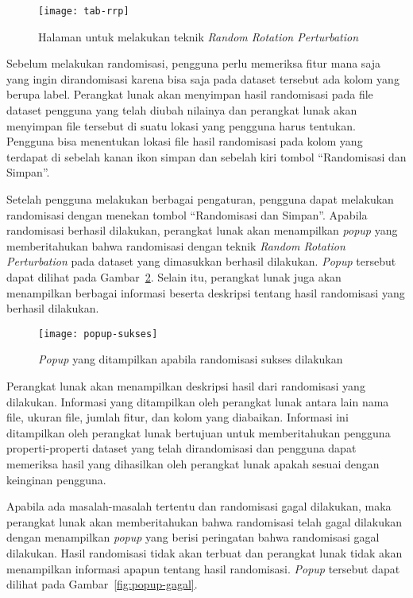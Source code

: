 \begin{figure}
	\centering
	\texttt{[image: tab-rrp]}
	\caption{Halaman untuk melakukan teknik \textit{Random Rotation Perturbation}}
	\label{fig:tab-rrp}
\end{figure}

Sebelum melakukan randomisasi, pengguna perlu memeriksa fitur mana saja yang ingin dirandomisasi karena bisa saja pada dataset tersebut ada kolom yang berupa label. Perangkat lunak akan menyimpan hasil randomisasi pada file dataset pengguna yang telah diubah nilainya dan perangkat lunak akan menyimpan file tersebut di suatu lokasi yang pengguna harus tentukan. Pengguna bisa menentukan lokasi file hasil randomisasi pada kolom yang terdapat di sebelah kanan ikon simpan dan sebelah kiri tombol \textquotedblleft Randomisasi dan Simpan\textquotedblright.

Setelah pengguna melakukan berbagai pengaturan, pengguna dapat melakukan randomisasi dengan menekan tombol \textquotedblleft Randomisasi dan Simpan\textquotedblright. Apabila randomisasi berhasil dilakukan, perangkat lunak akan menampilkan \textit{popup} yang memberitahukan bahwa randomisasi dengan teknik \textit{Random Rotation Perturbation} pada dataset yang dimasukkan berhasil dilakukan. \textit{Popup} tersebut dapat dilihat pada Gambar~\ref{fig:popup-sukses}. Selain itu, perangkat lunak juga akan menampilkan berbagai informasi beserta deskripsi tentang hasil randomisasi yang berhasil dilakukan.

\begin{figure}
	\centering
	\texttt{[image: popup-sukses]}
	\caption{\textit{Popup} yang ditampilkan apabila randomisasi sukses dilakukan}
	\label{fig:popup-sukses}
\end{figure}

Perangkat lunak akan menampilkan deskripsi hasil dari randomisasi yang dilakukan. Informasi yang ditampilkan oleh perangkat lunak antara lain nama file, ukuran file, jumlah fitur, dan kolom yang diabaikan. Informasi ini ditampilkan oleh perangkat lunak bertujuan untuk memberitahukan pengguna properti-properti dataset yang telah dirandomisasi dan pengguna dapat memeriksa hasil yang dihasilkan oleh perangkat lunak apakah sesuai dengan keinginan pengguna.

Apabila ada masalah-masalah tertentu dan randomisasi gagal dilakukan, maka perangkat lunak akan memberitahukan bahwa randomisasi telah gagal dilakukan dengan menampilkan \textit{popup} yang berisi peringatan bahwa randomisasi gagal dilakukan. Hasil randomisasi tidak akan terbuat dan perangkat lunak tidak akan menampilkan informasi apapun tentang hasil randomisasi. \textit{Popup} tersebut dapat dilihat pada Gambar~\ref{fig:popup-gagal}.

